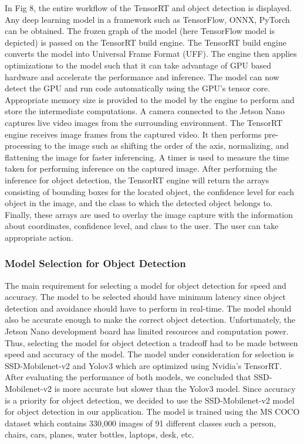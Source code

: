 \documentclass{IEEEtran}
\begin{document}
In Fig 8, the entire workflow of the TensorRT and object detection is displayed. Any deep learning model in a framework such as TensorFlow, ONNX, PyTorch can be obtained. The frozen graph of the model (here TensorFlow model is depicted) is passed on the TensorRT build engine. The TensorRT build engine converts the model into Universal Frame Format (UFF). The engine then applies optimizations to the model such that it can take advantage of GPU based hardware and accelerate the performance and inference. The model can now detect the GPU and run code automatically using the GPU’s tensor core. Appropriate memory size is provided to the model by the engine to perform and store the intermediate computations. A camera connected to the Jetson Nano captures live video images from the surrounding environment. The TensorRT engine receives image frames from the captured video. It then performs pre-processing to the image such as shifting the order of the axis, normalizing, and flattening the image for faster inferencing. A timer is used to measure the time taken for performing inference on the captured image. After performing the inference for object detection, the TensorRT engine will return the arrays consisting of bounding boxes for the located object, the confidence level for each object in the image, and the class to which the detected object belongs to. Finally, these arrays are used to overlay the image capture with the information about coordinates, confidence level, and class to the user. The user can take appropriate action.

\subsubsection{Model Selection for Object Detection}
The main requirement for selecting a model for object detection for speed and accuracy. The model to be selected should have minimum latency since object detection and avoidance should have to perform in real-time. The model should also be accurate enough to make the correct object detection. Unfortunately, the Jetson Nano development board has limited resources and computation power. Thus, selecting the model for object detection a tradeoff had to be made between speed and accuracy of the model. The model under consideration for selection is SSD-Mobilenet-v2 and Yolov3 which are optimized using Nvidia’s TensorRT. After evaluating the performance of both models, we concluded that SSD-Mobilenet-v2 is more accurate but slower than the Yolov3 model. Since accuracy is a priority for object detection, we decided to use the SSD-Mobilenet-v2 model for object detection in our application. The model is trained using the MS COCO dataset which contains 330,000 images of 91 different classes such a person, chairs, cars, planes, water bottles, laptops, desk, etc. 
\end{document}
